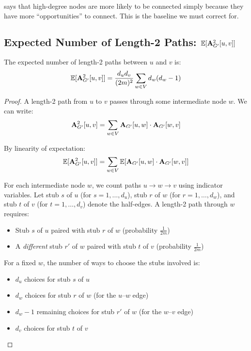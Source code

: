 \begin{notechapter}
\begin{intuition}
 says that high-degree nodes are more likely to be connected simply because they have more ``opportunities'' to connect. This is the baseline we must correct for.
\end{intuition}

\subsection{Expected Number of Length-2 Paths: $\mathbb{E}[\mathbf{A}_{G'}^2[u,v]]$}

\begin{proposition}
\label{lhn-similarity:prop:expected-path2}
The expected number of length-2 paths between $u$ and $v$ is:
\begin{equation}
\mathbb{E}[\mathbf{A}_{G'}^2[u,v]] = \frac{d_u d_v}{(2m)^2} \sum_{w \in V} d_w(d_w - 1)
\label{lhn-similarity:eq:expected-path2}
\end{equation}
\end{proposition}

\begin{proof}
A length-2 path from $u$ to $v$ passes through some intermediate node $w$. We can write:
\[
\mathbf{A}_{G'}^2[u,v] = \sum_{w \in V} \mathbf{A}_{G'}[u,w] \cdot \mathbf{A}_{G'}[w,v]
\]

By linearity of expectation:
\[
\mathbb{E}[\mathbf{A}_{G'}^2[u,v]] = \sum_{w \in V} \mathbb{E}[\mathbf{A}_{G'}[u,w] \cdot \mathbf{A}_{G'}[w,v]]
\]

For each intermediate node $w$, we count paths $u \to w \to v$ using indicator variables. Let stub $s$ of $u$ (for $s = 1, \ldots, d_u$), stub $r$ of $w$ (for $r = 1, \ldots, d_w$), and stub $t$ of $v$ (for $t = 1, \ldots, d_v$) denote the half-edges. A length-2 path through $w$ requires:
\begin{itemize}
    \item Stub $s$ of $u$ paired with stub $r$ of $w$ (probability $\frac{1}{2m}$)
    \item A \emph{different} stub $r'$ of $w$ paired with stub $t$ of $v$ (probability $\frac{1}{2m}$)
\end{itemize}

For a fixed $w$, the number of ways to choose the stubs involved is:
\begin{itemize}
    \item $d_u$ choices for stub $s$ of $u$
    \item $d_w$ choices for stub $r$ of $w$ (for the $u$--$w$ edge)
    \item $d_w - 1$ remaining choices for stub $r'$ of $w$ (for the $w$--$v$ edge)
    \item $d_v$ choices for stub $t$ of $v$
\end{itemize}


\end{proof}
\end{notechapter}
